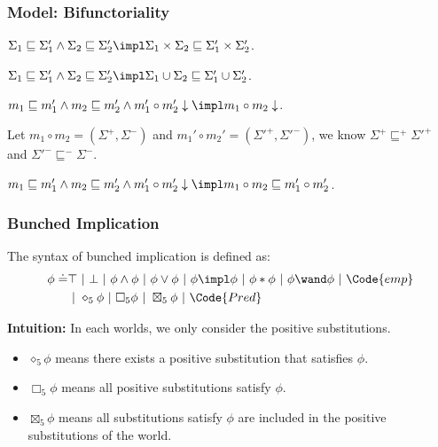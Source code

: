\begin{frame}[fragile]
    \frametitle{Model: Bifunctoriality}

\begin{lemma}
    $\Sigma_1 \sqsubseteq \Sigma_1' \land \Sigma_2 \sqsubseteq \Sigma_2' \impl \Sigma_1 \times \Sigma_2 \sqsubseteq \Sigma_1' \times \Sigma_2'$.
\end{lemma}

\begin{lemma}
    $\Sigma_1 \sqsubseteq \Sigma_1' \land \Sigma_2 \sqsubseteq \Sigma_2' \impl \Sigma_1 \cup \Sigma_2 \sqsubseteq \Sigma_1' \cup \Sigma_2'$.
\end{lemma}

\begin{lemma}
    $m_1 \sqsubseteq m_1' \land m_2 \sqsubseteq m_2' \land \compable{m_1'}{m_2'} \impl \compable{m_1}{m_2}$.
\end{lemma}
Let $m_1 \circ m_2 = (\Sigma^+, \Sigma^-)$ and $m_1' \circ m_2' = (\Sigma'^+, \Sigma'^-)$, we know $\Sigma^+ \sqsubseteq^+ \Sigma'^+$ and $\Sigma'^- \sqsubseteq^- \Sigma^-$.

\begin{lemma}[bifunctoriality]
    $m_1 \sqsubseteq m_1' \land m_2 \sqsubseteq m_2' \land \compable{m_1'}{m_2'} \impl m_1 \circ m_2 \sqsubseteq m_1' \circ m_2'$.
\end{lemma}

\end{frame}

\begin{frame}[fragile]
    \frametitle{Bunched Implication}

\begin{definition} The syntax of bunched implication is defined as:
    \begin{align*}
    \phi \doteq& \top ~|~ \bot ~|~ \phi \land \phi ~|~ \phi \lor \phi ~|~ \phi \impl \phi ~|~ \phi * \phi ~|~ \phi \wand \phi ~|~ \Code{emp}
    \\&~|~ \diamond_5 \phi ~|~ \Box_5 \phi ~|~ \boxtimes_5 \phi ~|~ \Code{Pred}
    \end{align*}\noindent
\end{definition}

\textbf{Intuition:} In each worlds, we only consider the positive substitutions.
\begin{itemize}
    \item $\diamond_5 \phi$ means there exists a positive substitution that satisfies $\phi$.
    \item $\Box_5 \phi$ means all positive substitutions satisfy $\phi$.
    \item $\boxtimes_5 \phi$ means all substitutions satisfy $\phi$ are included in the positive substitutions of the world.
\end{itemize}

\end{frame}

